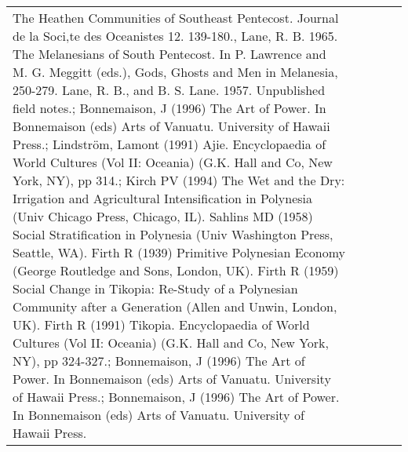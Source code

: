 \begin{table}[ht]
\begin{tabular}{p{5cm}p{2cm}p{2cm}p{2cm}p{2cm}}
The Heathen Communities of Southeast Pentecost. Journal de la Soci‚te des Oceanistes 12. 139-180., Lane, R. B. 1965. The Melanesians of South Pentecost. In P. Lawrence and M. G. Meggitt (eds.), Gods, Ghosts and Men in Melanesia, 250-279. Lane, R. B., and B. S. Lane. 1957. Unpublished field notes.; Bonnemaison, J (1996) The Art of Power. In Bonnemaison (eds) Arts of Vanuatu. University of Hawaii Press.; Lindström, Lamont (1991) Ajie. Encyclopaedia of World Cultures (Vol II: Oceania) (G.K. Hall and Co, New York, NY), pp 314.; Kirch PV (1994) The Wet and the Dry: Irrigation and Agricultural Intensification in Polynesia (Univ Chicago Press, Chicago, IL). Sahlins MD (1958) Social Stratification in Polynesia (Univ Washington Press, Seattle, WA). Firth R (1939) Primitive Polynesian Economy (George Routledge and Sons, London, UK). Firth R (1959) Social Change in Tikopia: Re-Study of a Polynesian Community after a Generation (Allen and Unwin, London, UK). Firth R (1991) Tikopia. Encyclopaedia of World Cultures (Vol II: Oceania) (G.K. Hall and Co, New York, NY), pp 324-327.; Bonnemaison, J (1996) The Art of Power. In Bonnemaison (eds) Arts of Vanuatu. University of Hawaii Press.; Bonnemaison, J (1996) The Art of Power. In Bonnemaison (eds) Arts of Vanuatu. University of Hawaii Press. \\ 

\end{tabular}
\end{table}
